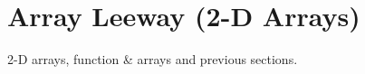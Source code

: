 \documentclass[../../Problems]{subfiles}
\begin{document}
\section{Array Leeway (2-D Arrays)}
\begin{topics}
2-D arrays, function \& arrays and previous sections.
\end{topics}




\end{document}
